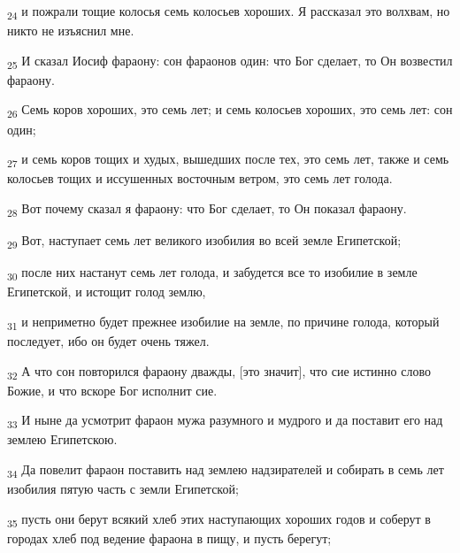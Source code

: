 \begin{tcolorbox}
\textsubscript{24} и пожрали тощие колосья семь колосьев хороших. Я рассказал это волхвам, но никто не изъяснил мне.
\end{tcolorbox}
\begin{tcolorbox}
\textsubscript{25} И сказал Иосиф фараону: сон фараонов один: что Бог сделает, то Он возвестил фараону.
\end{tcolorbox}
\begin{tcolorbox}
\textsubscript{26} Семь коров хороших, это семь лет; и семь колосьев хороших, это семь лет: сон один;
\end{tcolorbox}
\begin{tcolorbox}
\textsubscript{27} и семь коров тощих и худых, вышедших после тех, это семь лет, также и семь колосьев тощих и иссушенных восточным ветром, это семь лет голода.
\end{tcolorbox}
\begin{tcolorbox}
\textsubscript{28} Вот почему сказал я фараону: что Бог сделает, то Он показал фараону.
\end{tcolorbox}
\begin{tcolorbox}
\textsubscript{29} Вот, наступает семь лет великого изобилия во всей земле Египетской;
\end{tcolorbox}
\begin{tcolorbox}
\textsubscript{30} после них настанут семь лет голода, и забудется все то изобилие в земле Египетской, и истощит голод землю,
\end{tcolorbox}
\begin{tcolorbox}
\textsubscript{31} и неприметно будет прежнее изобилие на земле, по причине голода, который последует, ибо он будет очень тяжел.
\end{tcolorbox}
\begin{tcolorbox}
\textsubscript{32} А что сон повторился фараону дважды, [это значит], что сие истинно слово Божие, и что вскоре Бог исполнит сие.
\end{tcolorbox}
\begin{tcolorbox}
\textsubscript{33} И ныне да усмотрит фараон мужа разумного и мудрого и да поставит его над землею Египетскою.
\end{tcolorbox}
\begin{tcolorbox}
\textsubscript{34} Да повелит фараон поставить над землею надзирателей и собирать в семь лет изобилия пятую часть с земли Египетской;
\end{tcolorbox}
\begin{tcolorbox}
\textsubscript{35} пусть они берут всякий хлеб этих наступающих хороших годов и соберут в городах хлеб под ведение фараона в пищу, и пусть берегут;
\end{tcolorbox}
